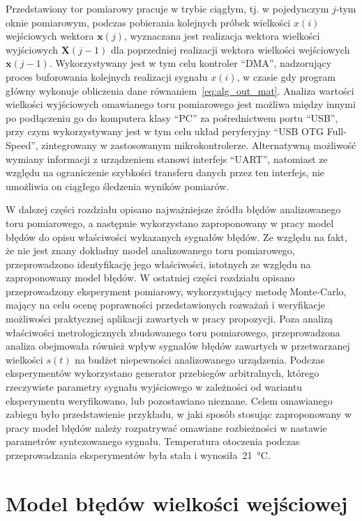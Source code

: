 Przedstawiony tor pomiarowy pracuje w trybie ciągłym, tj. w pojedynczym $j$-tym oknie pomiarowym, podczas pobierania kolejnych próbek wielkości $x(i)$ wejściowych wektora $\mathbf{x}(j)$, wyznaczana jest realizacja wektora wielkości wyjściowych $\mathbf{X}(j-1)$ dla poprzedniej realizacji wektora wielkości wejściowych $\mathbf{x}(j-1)$. Wykorzystywany jest w tym celu kontroler \enquote{DMA}, nadzorujący proces buforowania kolejnych realizacji sygnału $x(i)$, w czasie gdy program główny wykonuje obliczenia dane równaniem~\eqref{eq:alg_out_mat}. Analiza wartości wielkości wyjściowych omawianego toru pomiarowego jest możliwa między innymi po podłączeniu go do komputera klasy \enquote{PC} za pośrednictwem portu \enquote{USB}, przy czym wykorzystywany jest w tym celu układ peryferyjny \enquote{USB OTG Full-Speed}, zintegrowany w zastosowanym mikrokontrolerze. Alternatywną możliwość wymiany informacji z urządzeniem stanowi interfejs \enquote{UART}, natomiast ze względu na ograniczenie szybkości transferu danych przez ten interfejs, nie umożliwia on ciągłego śledzenia wyników pomiarów.

W dalszej części rozdziału opisano najważniejsze źródła błędów analizowanego toru pomiarowego, a następnie wykorzystano zaproponowany w pracy model błędów do opisu właściwości wykazanych sygnałów błędów. Ze względu na fakt, że nie jest znany dokładny model analizowanego toru pomiarowego, przeprowadzono identyfikację jego właściwości, istotnych ze względu na zaproponowany model błędów. W ostatniej części rozdziału opisano przeprowadzony eksperyment pomiarowy, wykorzystujący metodę Monte-Carlo, mający na celu ocenę poprawności przedstawionych rozważań i weryfikacje możliwości praktycznej aplikacji zawartych w pracy propozycji. Poza analizą właściwości metrologicznych zbudowanego toru pomiarowego, przeprowadzona analiza obejmowała również wpływ sygnałów błędów zawartych w przetwarzanej wielkości $s(t)$ na budżet niepewności analizowanego urządzenia. Podczas eksperymentów wykorzystano generator przebiegów arbitralnych, którego rzeczywiste parametry sygnału wyjściowego w zależności od wariantu eksperymentu weryfikowano, lub pozostawiano nieznane. Celem omawianego zabiegu było przedstawienie przykładu, w jaki sposób stosując zaproponowany w pracy model błędów należy rozpatrywać omawiane rozbieżności w nastawie parametrów syntezowanego sygnału. Temperatura otoczenia podczas przeprowadzania eksperymentów była stała i wynosiła~\qty{21}{\degreeCelsius}.

\section{Model błędów wielkości wejściowej}

